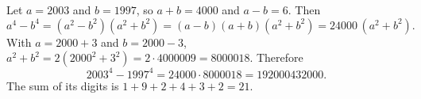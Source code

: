 Let $a=2003$ and $b=1997$, so $a+b=4000$ and $a-b=6$. Then
\[
a^4-b^4=(a^2-b^2)(a^2+b^2)=(a-b)(a+b)(a^2+b^2)=24000\,(a^2+b^2).
\]
With $a=2000+3$ and $b=2000-3$, $a^2+b^2=2\left(2000^2+3^2\right)=2\cdot4000009=8000018$. Therefore
\[
2003^4-1997^4=24000\cdot8000018=192000432000 .
\]
The sum of its digits is $1+9+2+4+3+2=\boxed{21}$.
